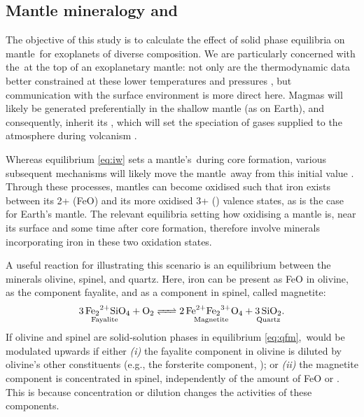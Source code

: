 \subsection{Mantle mineralogy and \fo}

The objective of this study is to calculate the effect of solid phase equilibria on mantle \fo\,for exoplanets of diverse composition. We are particularly concerned with the \fo\,at the top of an exoplanetary mantle: not only are the thermodynamic data better constrained at these lower temperatures and pressures \citep[$\lesssim 25\,$GPa;][]{guimond_mantle_2023}, but communication with the surface environment is more direct here. Magmas will likely be generated preferentially in the shallow mantle (as on Earth), and consequently, inherit its \fo, which will set the speciation of gases supplied to the atmosphere during volcanism \citep{gaillard_redox_2015, ortenzi_mantle_2020, Liggins2020, guimond_low_2021}. 

Whereas equilibrium \eqref{eq:iw} sets a mantle's \fo\,during core formation, various subsequent mechanisms will likely move the mantle \fo\,away from this initial value \citep[e.g.,][]{frost_experimental_2004, wade_core_2005, Wood2006, williams_isotopic_2012, rubie_accretion_2015, hirschmann_magma_2022}. Through these processes, mantles can become oxidised such that iron exists between its 2+ (FeO) and its more oxidised 3+ () valence states, as is the case for Earth's mantle. The relevant equilibria setting how oxidising a mantle is, near its surface and some time after core formation, therefore involve minerals incorporating iron in these two oxidation states.

A useful reaction for illustrating this scenario is an equilibrium between the minerals olivine, spinel, and quartz. Here, iron can be present as FeO in olivine, as the component fayalite, and as a  component in spinel, called magnetite:
\begin{equation}\label{eq:qfm}
    \ce{$\underset{\text{Fayalite}}{\ce{3 Fe_2^{2+}SiO4}}$ + O2 <=> $\underset{\text{Magnetite}}{\ce{2 Fe^{2+}Fe2^{3+}O4}}$ + $\underset{\text{Quartz}}{\ce{3 SiO2}}$}.
\end{equation}
If olivine and spinel are solid-solution phases in equilibrium \eqref{eq:qfm}, \fo\,would be modulated upwards if either \textit{(i)} the fayalite component in olivine is diluted by olivine's other constituents (e.g., the forsterite component, ); or \textit{(ii)} the magnetite component is concentrated in spinel, independently of the amount of FeO or . This is because concentration or dilution changes the activities of these components.

